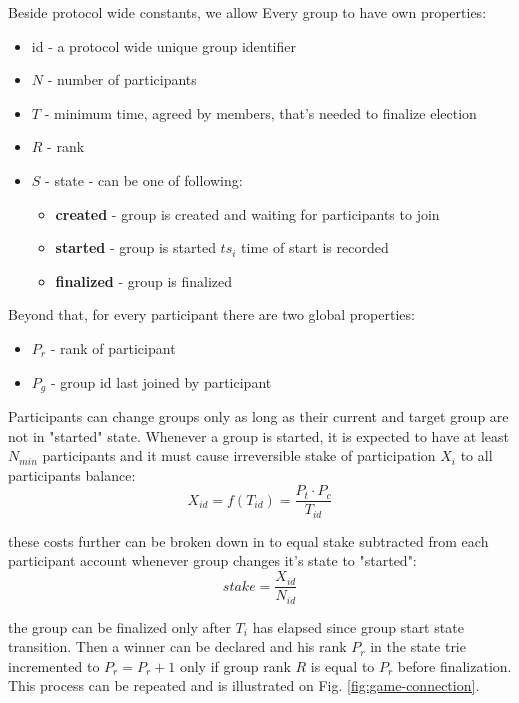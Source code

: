 \documentclass{article}
\begin{document}
\begin{CJK}{UTF8}{gbsn}
    Beside protocol wide constants, we allow Every group to have own properties:
    \begin{itemize}[nosep]
        \item id - a protocol wide unique group identifier
        \item $N$ - number of participants
        \item $T$ - minimum time, agreed by members, that's needed to finalize election
        \item $R$ - rank
        \item $S$ -  state - can be one of following:
              \begin{itemize}[nosep]
                  \item \textbf{created} - group is created and waiting for participants to join
                  \item \textbf{started} - group is started $ts_i$ time of start is recorded
                  \item \textbf{finalized} - group is finalized
              \end{itemize}
    \end{itemize}


    Beyond that, for every participant there are two global properties:
    \begin{itemize}[nosep]
        \item  $P_r$ - rank of participant
        \item $P_g$ - group id last joined by participant
    \end{itemize}

    Participants can change groups only as long as their current and target group are not in "started" state. Whenever a group is started, it is expected to have at least $N_{min}$ participants and it must cause irreversible stake of participation $X_i$ to all participants balance:
    \begin{equation}
        \label{eq:group-fee}
        X_{id} = f(T_{id}) = \dfrac{P_t \cdot  P_c }{T_{id}}
    \end{equation}

    these costs further can be broken down in to equal stake subtracted from each participant account whenever group changes it's state to "started":
    \begin{equation}
        \label{eq:join-fee}
        stake = \dfrac{X_{id}}{ N_{id}}
    \end{equation}
    
    the group can be finalized only after $T_{i}$ has elapsed since group start state transition. Then a winner can be declared and his rank $P_r$ in the state trie incremented to $P_r=P_r+1$ only if group rank $R$ is equal to $P_r$ before finalization. This process can be repeated and is illustrated on Fig. \ref*{fig:game-connection}.


\end{CJK}
\end{document}
